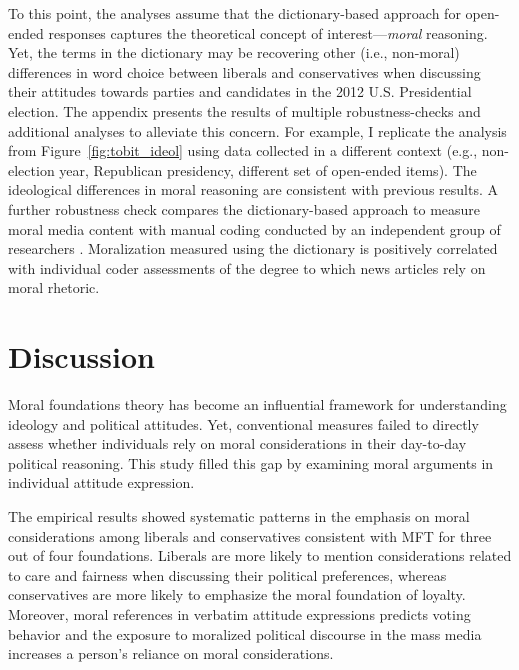 \documentclass[12pt]{article}
\begin{document}
To this point, the analyses assume that the dictionary-based approach for open-ended responses captures the theoretical concept of interest---\textit{moral} reasoning. Yet, the terms in the dictionary may be recovering other (i.e., non-moral) differences in word choice between liberals and conservatives when discussing their attitudes towards parties and candidates in the 2012 U.S. Presidential election. The appendix presents the results of multiple robustness-checks and additional analyses to alleviate this concern. For example, I replicate the analysis from Figure~\ref{fig:tobit_ideol} using data collected in a different context (e.g., non-election year, Republican presidency, different set of open-ended items). The ideological differences in moral reasoning are consistent with previous results. A further robustness check compares the dictionary-based approach to measure moral media content with manual coding conducted by an independent group of researchers \citep{feinberg2013moral}. Moralization measured using the dictionary is positively correlated with individual coder assessments of the degree to which news articles rely on moral rhetoric.



\section*{Discussion}


Moral foundations theory has become an influential framework for understanding ideology and political attitudes. Yet, conventional measures failed to directly assess whether individuals rely on moral considerations in their day-to-day political reasoning. This study filled this gap by examining moral arguments in individual attitude expression.

The empirical results showed systematic patterns in the emphasis on moral considerations among liberals and conservatives consistent with MFT for three out of four foundations. Liberals are more likely to mention considerations related to care and fairness when discussing their political preferences, whereas conservatives are more likely to emphasize the moral foundation of loyalty. Moreover, moral references in verbatim attitude expressions predicts voting behavior and the exposure to moralized political discourse in the mass media increases a person's reliance on moral considerations. 
\end{document}
